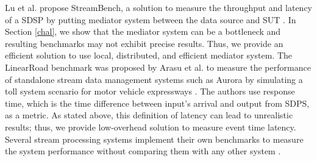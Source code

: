 Lu et al. propose StreamBench, a solution to measure the throughput and latency of a SDSP by putting mediator system between the data source and SUT \cite{lu2014stream}. In Section \ref{chal}, we show that the mediator system can be a bottleneck and resulting benchmarks may not exhibit precise results. Thus, we provide an efficient  solution to use local,  distributed, and efficient mediator system.  The LinearRoad benchmark was proposed by Arasu et al. to measure the performance of standalone stream data management systems such as Aurora \cite{abadi2003aurora} by simulating a toll system scenario for motor vehicle expressways \cite{arasu2004linear}. The authors use response time, which is the time difference between input's arrival and output from SDPS, as a metric. As stated above, this definition of latency can lead to unrealistic results; thus, we provide low-overhead solution to measure event time latency.
Several stream processing systems implement their own benchmarks to measure the system performance without comparing them with any other system \cite{neumeyer2010s4,qian2013timestream,zaharia2012discretized}. 

 
 
